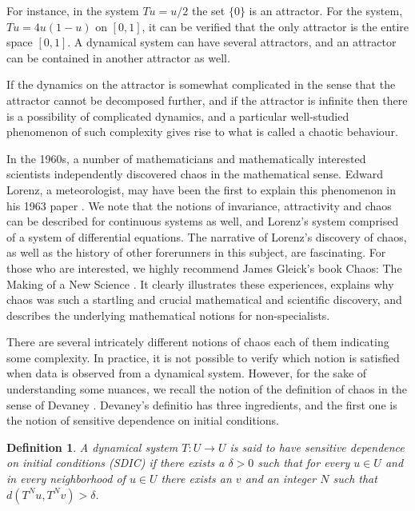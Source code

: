 \documentclass[12 pt]{article}
\newtheorem{Definition}{Definition}[]
\begin{document}
For instance, in the system  $Tu=u/2$ the set $\{0\}$ is an attractor. For the system,  $Tu=4u(1-u)$ on $[0,1]$, it can be verified that the only attractor is the entire space $[0,1]$. A dynamical system can have several attractors, and an attractor can be contained in another attractor as well. 

If the dynamics on the attractor is somewhat complicated in the sense that the attractor cannot be decomposed further, and if the attractor is infinite then there is a possibility of complicated dynamics, and a particular well-studied phenomenon of such complexity gives rise to what is called a chaotic behaviour. 


In the 1960s, a number of mathematicians and mathematically interested scientists independently discovered chaos in the mathematical sense. Edward Lorenz, a meteorologist, may have been the first to explain this phenomenon in his 1963 paper \cite{lorenz1963deterministic}. We note that the notions of invariance, attractivity and chaos can be described for continuous systems as well, and Lorenz's system comprised of a system of differential equations. The narrative of Lorenz's discovery of chaos, as well as the history of other forerunners in this subject, are fascinating. For those who are interested, we highly recommend James Gleick's book Chaos: The Making of a New Science \cite{gleick2008chaos}. It clearly illustrates these experiences, explains why chaos was such a startling and crucial mathematical and scientific discovery, and describes the underlying mathematical notions for non-specialists.

There are several intricately different notions of chaos each of them indicating some complexity. In practice, it is not possible to verify which notion is satisfied when data is observed from a dynamical system. However, for the sake of understanding some nuances, we recall the notion of the definition of chaos in the sense of Devaney \cite{devaney2018introduction,de2013elements}. Devaney's definitio has three ingredients, and the first one is the notion of sensitive dependence on initial conditions. 

\begin{Definition} \rm 
A dynamical system $T: U \to U$ is said to have sensitive dependence on initial conditions (SDIC) if there exists a $\delta > 0$ such that for every $u \in U$ and in every neighborhood of $u \in U$ there exists an $v$ and an integer $N$ such that $d(T^Nu,T^Nv)>\delta$. 	
\end{Definition}
\end{document}
